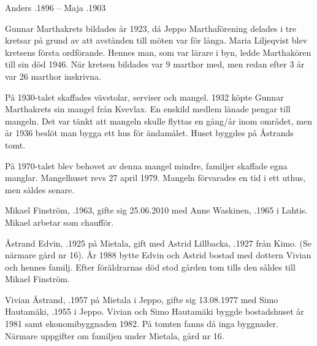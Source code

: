 Anders .1896  --  Maja .1903




Gunnar Marthakrets bildades år 1923, då Jeppo Marthaförening delades i tre kretsar på grund av att avstånden till möten var för långa. Maria Liljeqvist blev kretsens första ordförande. Hennes man, som var lärare i byn, ledde Marthakören till sin död 1946. När kretsen bildades var 9 marthor med, men redan efter 3 år var 26 marthor inskrivna.

På 1930-talet skaffades vävstolar, serviser och mangel. 1932 köpte Gunnar Marthakrets sin mangel från Kvevlax. En enskild medlem lånade pengar till mangeln. Det var tänkt att mangeln skulle flyttas en gång/år inom området, men år 1936 beslöt man bygga ett hus för ändamålet. Huset byggdes på Åstrands tomt.

På 1970-talet blev behovet av denna mangel mindre, familjer skaffade egna manglar. Mangelhuset revs 27 april 1979. Mangeln förvarades en tid i ett uthus, men såldes senare.




Mikael Finström, .1963, gifte sig 25.06.2010 med Anne Waskinen, .1965 i Lahtis. Mikael arbetar som chaufför.


Åstrand Edvin, .1925 på Mietala, gift med Astrid Lillbacka, .1927 från Kimo. (Se närmare gård nr 16). År 1988 bytte Edvin och Astrid bostad med dottern Vivian och hennes familj. Efter föräldrarnas död stod gården tom tills den såldes till Mikael Finström.

Vivian Åstrand, .1957  på Mietala i Jeppo, gifte sig 13.08.1977 med Simo Hautamäki, .1955 i Jeppo. Vivian och Simo Hautamäki byggde bostadshuset år 1981 samt ekonomibyggnaden 1982. På tomten fanns då inga byggnader. Närmare uppgifter om familjen under Mietala, gård nr 16.





